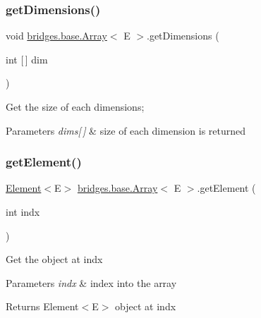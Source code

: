 \subsubsection{\texorpdfstring{getDimensions()}{getDimensions()}}
{\footnotesize\ttfamily void \mbox{\hyperlink{classbridges_1_1base_1_1_array}{bridges.\+base.\+Array}}$<$ E $>$.get\+Dimensions (\begin{DoxyParamCaption}\item[{int \mbox{[}$\,$\mbox{]}}]{dim }\end{DoxyParamCaption})}

Get the size of each dimensions;


\begin{DoxyParams}{Parameters}
{\em dims\mbox{[}$\,$\mbox{]}} & size of each dimension is returned \\
\hline
\end{DoxyParams}
\mbox{\label{classbridges_1_1base_1_1_array_a0e690cbe2606e44cce99b56802b63e0e}} 
\subsubsection{\texorpdfstring{getElement()}{getElement()}\hspace{0.1cm}{\footnotesize\ttfamily [1/3]}}
{\footnotesize\ttfamily \mbox{\hyperlink{classbridges_1_1base_1_1_element}{Element}}$<$E$>$ \mbox{\hyperlink{classbridges_1_1base_1_1_array}{bridges.\+base.\+Array}}$<$ E $>$.get\+Element (\begin{DoxyParamCaption}\item[{int}]{indx }\end{DoxyParamCaption})}

Get the object at \textquotesingle{}indx\textquotesingle{}


\begin{DoxyParams}{Parameters}
{\em indx} & index into the array \\
\hline
\end{DoxyParams}
\begin{DoxyReturn}{Returns}
Element$<$\+E$>$ object at \textquotesingle{}indx\textquotesingle{} 
\end{DoxyReturn}
\mbox{\label{classbridges_1_1base_1_1_array_a9eff153c6b63572c18af6194c66ca34c}} 
